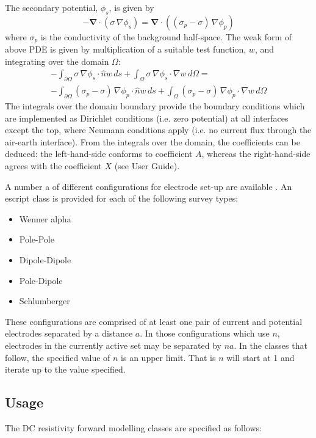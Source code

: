 The secondary potential, $\phi_s$, is given by
\begin{equation}\label{ref:dcres:eq4}
-\mathbf{\nabla}\cdot\left(\sigma\,\nabla \phi_s \right)  = 
 \mathbf{\nabla}\cdot\left( \left(\sigma_p-\sigma\right)\,\nabla \phi_p  \right)
\end{equation} 
where $\sigma_p$ is the conductivity of the background half-space.
The weak form of above PDE is given by multiplication of a suitable test function, $w$, and integrating over the domain $\Omega$:
\begin{multline}\label{ref:dcres:eq5}
-\int_{\partial\Omega} \sigma\,\nabla \phi_s  \cdot \hat{n} w\,ds +
 \int_{\Omega} \sigma\,\nabla \phi_s  \cdot \nabla w\,d\Omega =\\
-\int_{\partial\Omega} \left(\sigma_p-\sigma\right)\,\nabla \phi_p  
\cdot \hat{n} w\,ds + \int_{\Omega} \left(\sigma_p-\sigma\right)\,\nabla \phi_p  \cdot \nabla w\,d\Omega 
\end{multline}
The integrals over the domain boundary provide the boundary conditions which are
implemented as Dirichlet conditions (i.e. zero potential) at all interfaces except the
top, where Neumann conditions apply (i.e. no current flux through the air-earth interface).
From the integrals over the domain, the \escript coefficients can be deduced: the 
left-hand-side conforms to \escript coefficient $A$, whereas the right-hand-side agrees
with the coefficient $X$ (see User Guide).

A number a of different configurations for electrode set-up are available \cite[pg 5]{LOKE2014}.
An escript class is provided for each of the following survey types:
\begin{itemize}
\item Wenner alpha
\item Pole-Pole
\item Dipole-Dipole
\item Pole-Dipole
\item Schlumberger
\end{itemize}

These configurations are comprised of at least one pair of current and potential
electrodes separated by a distance $a$. In those configurations which use $n$,
electrodes in the currently active set may be separated by $na$. In the classes
that follow, the specified value of $n$ is an upper limit. That is $n$ will
start at 1 and iterate up to the value specified.

\subsection{Usage}
The DC resistivity forward modelling classes are specified as follows:

